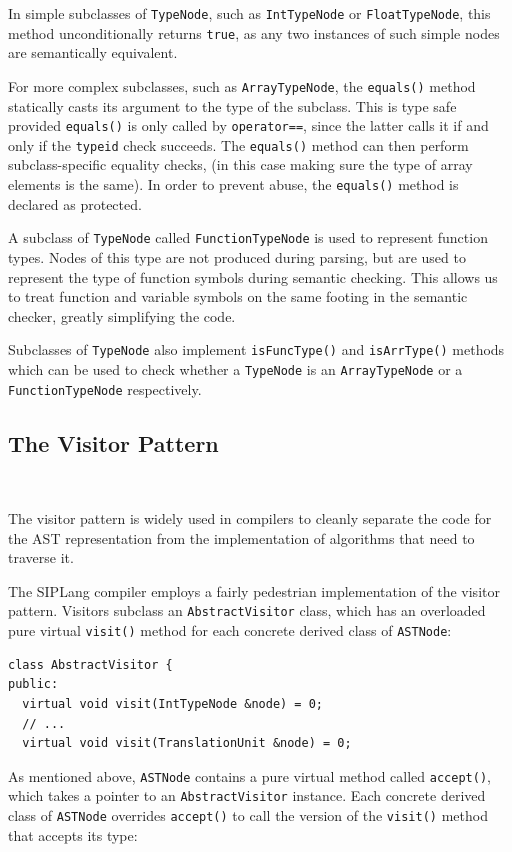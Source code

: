 \documentclass[11pt,a4paper]{scrartcl}
\begin{document}
In simple subclasses of \verb!TypeNode!, such as \verb!IntTypeNode! or \verb!FloatTypeNode!, this method unconditionally returns \verb|true|, as any two instances of such simple nodes are semantically equivalent.

For more complex subclasses, such as \verb!ArrayTypeNode!, the \verb!equals()! method statically casts its argument to the type of the subclass. This is type safe provided \verb!equals()! is only called by \verb!operator==!, since the latter calls it if and only if the \verb|typeid| check succeeds. The \verb!equals()! method can then perform subclass-specific equality checks, (in this case making sure the type of array elements is the same). In order to prevent abuse, the \verb|equals()| method is declared as protected.

A subclass of \verb!TypeNode! called \verb!FunctionTypeNode! is used to represent function types. Nodes of this type are not produced during parsing, but are used to represent the type of function symbols during semantic checking. This allows us to treat function and variable symbols on the same footing in the semantic checker, greatly simplifying the code.

Subclasses of \verb!TypeNode! also implement \verb!isFuncType()! and \verb!isArrType()! methods which can be used to check whether a \verb!TypeNode! is an \verb!ArrayTypeNode! or a \verb!FunctionTypeNode! respectively.

\subsection{The Visitor Pattern}~\label{sec:visitor}

The visitor pattern is widely used in compilers to cleanly separate the code for the AST representation from the implementation of algorithms that need to traverse it.

The SIPLang compiler employs a fairly pedestrian implementation of the visitor pattern. Visitors subclass an \verb!AbstractVisitor! class, which has an overloaded pure virtual \verb!visit()! method for each concrete derived class of \verb!ASTNode!:

\begin{verbatim}
class AbstractVisitor {
public:
  virtual void visit(IntTypeNode &node) = 0;
  // ...
  virtual void visit(TranslationUnit &node) = 0;
\end{verbatim}

As mentioned above, \verb!ASTNode! contains a pure virtual method called \verb!accept()!, which takes a pointer to an \verb!AbstractVisitor! instance. Each concrete derived class of \verb!ASTNode! overrides \verb!accept()! to call the version of the \verb!visit()! method that accepts its type:
\end{document}
